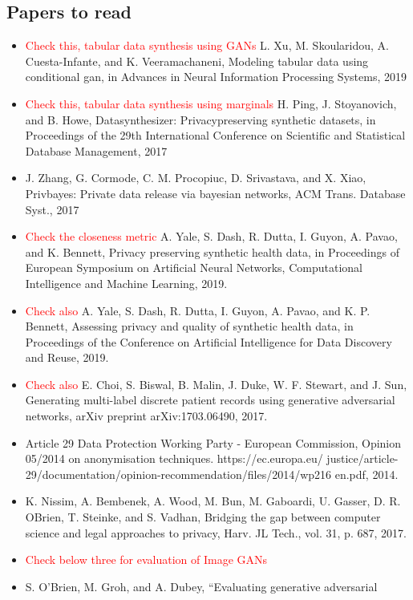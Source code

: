 \documentclass[11pt]{article}
\newcommand{\red}[1]{\textcolor{red}{#1}}
\begin{document}
    \subsection{Papers to read}
    \begin{itemize}
        \item \red{Check this, tabular data synthesis using GANs} L. Xu, M. Skoularidou, A. Cuesta-Infante, and K. Veeramachaneni, Modeling tabular data using conditional gan, in Advances in Neural Information Processing Systems, 2019
        \item \red{Check this, tabular data synthesis using marginals} H. Ping, J. Stoyanovich, and B. Howe, Datasynthesizer: Privacypreserving synthetic datasets, in Proceedings of the 29th International Conference on Scientific and Statistical Database Management, 2017
        \item J. Zhang, G. Cormode, C. M. Procopiuc, D. Srivastava, and X. Xiao, Privbayes: Private data release via bayesian networks, ACM Trans. Database Syst., 2017
        \item \red{Check the closeness metric} A. Yale, S. Dash, R. Dutta, I. Guyon, A. Pavao, and K. Bennett, Privacy preserving synthetic health data, in Proceedings of European Symposium on Artificial Neural Networks, Computational Intelligence and Machine Learning, 2019.
        \item \red{Check also} A. Yale, S. Dash, R. Dutta, I. Guyon, A. Pavao, and K. P. Bennett, Assessing privacy and quality of synthetic health data, in Proceedings of the Conference on Artificial Intelligence for Data Discovery and Reuse, 2019.
        \item \red{Check also} E. Choi, S. Biswal, B. Malin, J. Duke, W. F. Stewart, and J. Sun, Generating multi-label discrete patient records using generative adversarial networks, arXiv preprint arXiv:1703.06490, 2017.
        \item Article 29 Data Protection Working Party - European Commission, Opinion 05/2014 on anonymisation techniques. https://ec.europa.eu/ justice/article-29/documentation/opinion-recommendation/files/2014/wp216 en.pdf, 2014.
        \item K. Nissim, A. Bembenek, A. Wood, M. Bun, M. Gaboardi, U. Gasser, D. R. OBrien, T. Steinke, and S. Vadhan, Bridging the gap between computer science and legal approaches to privacy, Harv. JL Tech., vol. 31, p. 687, 2017.
        \item \red{Check below three for evaluation of Image GANs}
        \item S. O’Brien, M. Groh, and A. Dubey, “Evaluating generative adversarial

\end{itemize}
\end{document}
